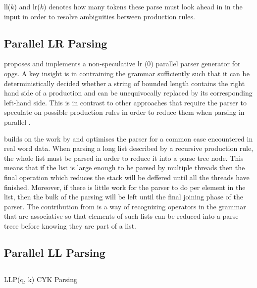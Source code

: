 \gls{ll}($k$) and \gls{lr}($k$) denotes how many tokens these parse must look
ahead in in the input in order to resolve ambiguities between production rules.

\subsection{Parallel LR Parsing}
\cite{barenghi_parallel_2015} proposes and implements a non-speculative \gls{lr}
(0) parallel parser generator for \gls{opg}s. A key insight is in contraining
the grammar sufficiently such that it can be deterministically decided whether
a string of bounded length contains the right hand side of a production
and can be unequivocally replaced by its corresponding left-hand side. This
is in contrast to other approaches that require the parser to speculate on
possible production rules in order to reduce them when parsing in parallel
\cite{mickunas_parallel_1978}.

\cite{li_associative_2023} builds on the work by \cite{barenghi_parallel_2015}
and optimises the parser for a common case encountered in real word data. When
parsing a long list described by a recursive production rule, the whole list
must be parsed in order to reduce it into a parse tree node. This means that
if the list is large enough to be parsed by multiple threads then the final
operation which reduces the stack will be deffered until all the threads have
finished. Moreover, if there is little work for the parser to do per element
in the list, then the bulk of the parsing will be left until the final joining
phase of the parser. The contribution from \cite{li_associative_2023} is a way
of recognizing operators in the grammar that are associative so that elements
of such lists can be reduced into a parse treee before knowing they are part of
a list.

\subsection{Parallel LL Parsing} 



\subsection{}
\begin{roughwork}
    LLP(q, k) \cite{robin_voetter_parallel_2021}
    \newline \newline
    CYK Parsing \cite{skrzypczak_parallel_nodate}
\end{roughwork}


